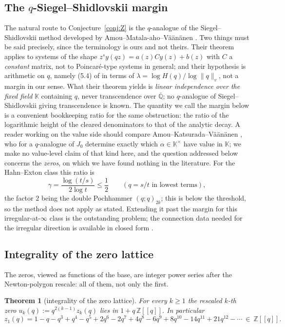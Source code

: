 \documentclass[11pt]{article}
\theoremstyle{plain}
\newtheorem{theorem}{Theorem}
\theoremstyle{definition}
\theoremstyle{remark}
\newcommand{\Z}{\mathbb{Z}}
\newcommand{\Q}{\mathbb{Q}}
\begin{document}
\subsection{The $q$-Siegel--Shidlovskii margin}
The natural route to Conjecture~\ref{conj:Z} is the $q$-analogue of the Siegel--Shidlovskii method
developed by Amou--Matala-aho--V\"a\"an\"anen \cite{AMV}. Two things must be said precisely, since
the terminology is ours and not theirs. Their theorem applies to systems of the shape
$z^sy(qz)=a(z)Cy(z)+b(z)$ with $C$ a \emph{constant} matrix, not to Poincar\'e-type systems in
general; and their hypothesis is arithmetic on $q$, namely (5.4) of \cite{AMV} in terms of
$\lambda=\log H(q)/\log\|q\|_v$, not a margin in our sense. What their theorem yields is
\emph{linear independence over the fixed field} $\mathbb K$ containing $q$, never transcendence over
$\overline{\Q}$; no $q$-analogue of Siegel--Shidlovskii giving transcendence is known. The
quantity we call the margin below is a convenient bookkeeping ratio for the same obstruction: the
ratio of the logarithmic height of the cleared denominators to that of the analytic decay. A reader
working on the value side should compare Amou--Katsurada--V\"a\"an\"anen \cite{AKV2002}, who for a
$q$-analogue of $J_0$ determine exactly which $\alpha\in\mathbb K^\times$ have value in $\mathbb K$;
we make no value-level claim of that kind here, and the question addressed below concerns the
\emph{zeros}, on which we have found nothing in the literature. For the Hahn--Exton class this ratio is
\[
   \gamma=\frac{\log(t/s)}{2\log t}\le\frac12\qquad(q=s/t\text{ in lowest terms}),
\]
the factor $2$ being the double Pochhammer $(q;q)_{2k}$; this is below the threshold, so the method does
not apply as stated. Extending it past the margin for this irregular-at-$\infty$ class is the
outstanding problem; the connection data needed for the irregular direction is available in closed form
\cite{Bonfioli2}.

\subsection{Integrality of the zero lattice}
The zeros, viewed as functions of the base, are integer power series after the Newton-polygon
rescale: all of them, not only the first.

\begin{theorem}[integrality of the zero lattice]\label{thm:integrality}
For every $k\ge1$ the rescaled $k$-th zero $u_k(q):=q^{2(k-1)}z_k(q)$ lies in $1+q\,\Z[[q]]$.
In particular
\[
   z_1(q)=1-q-q^3+q^4-q^5+2q^6-2q^7+4q^8-6q^9+8q^{10}-14q^{11}+21q^{12}-\cdots\ \in\ \Z[[q]] .
\]
\end{theorem}
\end{document}
